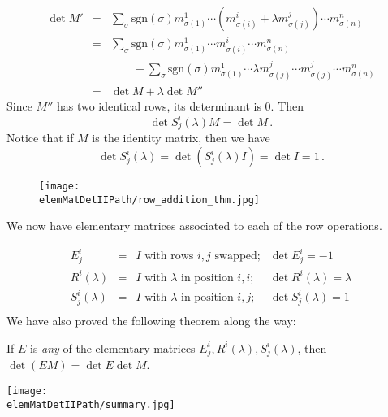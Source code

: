 \begin{eqnarray*}
\det M' & = & \sum_{\sigma} \text{sgn}(\sigma) m^1_{\sigma(1)}\cdots (m^i_{\sigma(i)}+ \lambda m^j_{\sigma(j)}) \cdots m^n_{\sigma(n)} \\
& = & \sum_{\sigma} \text{sgn}(\sigma) m^1_{\sigma(1)}\cdots m^i_{\sigma(i)} \cdots m^n_{\sigma(n)} \\
&   & \qquad + \sum_{\sigma} \text{sgn}(\sigma) m^1_{\sigma(1)}\cdots \lambda m^j_{\sigma(j)} \cdots m^j_{\sigma(j)} \cdots m^n_{\sigma(n)} \\
& = & \det M + \lambda \det M''
\end{eqnarray*}
Since $M''$ has two identical rows, its determinant is $0$.  Then $$\det S^i_j(\lambda)M = \det M\, .$$
Notice that if $M$ is the identity matrix, then we have $$\det S^i_j(\lambda) = \det (S^i_j(\lambda)I) = \det I = 1\, .$$

\begin{figure}
\begin{center}
\texttt{[image: \\elemMatDetIIPath/row\_addition\_thm.jpg]}
\end{center}
\end{figure}

We now have elementary matrices associated to each of the row operations.

\[
\begin{array}{cccc}
E^i_j &=& I \text{ with rows $i,j$ swapped;} &\det E^i_j=-1 \\[3mm]
R^i(\lambda) &=& I \text{ with $\lambda$ in position $i,i$;} 
	&\det R^i(\lambda)=\lambda \\[3mm]
S^i_j(\lambda) &=& I \text{ with $\lambda$ in position $i,j$;} 
	&\det S^i_j(\lambda)=1 \\[3mm]
\end{array}
\]
We have also proved the following theorem along the way:

\begin{theorem}
If $E$ is \emph{any} of the elementary matrices $E^i_j, R^i(\lambda), S^i_j(\lambda)$, then $\det(EM)=\det E \det M$.
\end{theorem}



\begin{center}
\hspace{3mm}\texttt{[image: \\elemMatDetIIPath/summary.jpg]}
\end{center}


